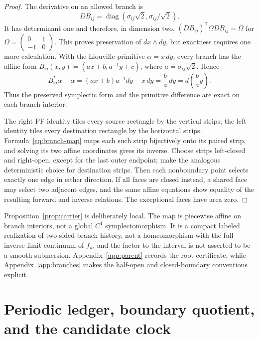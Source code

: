 \documentclass[11pt]{article}
\theoremstyle{definition}
\theoremstyle{remark}
\begin{document}
\begin{proof}
The derivative on an allowed branch is
\begin{equation}
 DB_{ij}=\operatorname{diag}
 (\sigma_{ij}\sqrt2,\sigma_{ij}/\sqrt2).
 \label{eq:jacobian}
\end{equation}
It has determinant one and therefore, in dimension two,
\((DB_{ij})^{\mathsf T}\Omega DB_{ij}=\Omega\) for
\(\Omega=\left(\begin{smallmatrix}0&1\\-1&0\end{smallmatrix}\right)\).
This proves preservation of \(dx\wedge dy\), but exactness requires one more
calculation.  With the Liouville primitive \(\alpha=x\,dy\), every branch has
the affine form
\(B_{ij}(x,y)=(a x+b,a^{-1}y+c)\), where
\(a=\sigma_{ij}\sqrt2\).  Hence
\begin{equation}
 B_{ij}^{*}\alpha-\alpha
 =(a x+b)a^{-1}dy-x\,dy
 =\frac{b}{a}\,dy
 =d\!\left(\frac{b}{a}y\right).
 \label{eq:exactness}
\end{equation}
Thus the preserved symplectic form and the primitive difference are exact on
each branch interior.

The right PF identity tiles every source rectangle by the vertical strips;
the left identity tiles every destination rectangle by the horizontal
strips.  Formula~\eqref{eq:branch-map} maps each such strip bijectively onto
its paired strip, and solving its two affine coordinates gives its inverse.
Choose strips left-closed and right-open, except for the last outer endpoint;
make the analogous deterministic choice for destination strips.  Then each
nonboundary point selects exactly one edge in either direction.  If all faces
are closed instead, a shared face may select two adjacent edges, and the
same affine equations show equality of the resulting forward and inverse
relations.  The exceptional faces have area zero.
\end{proof}

Proposition~\ref{prop:carrier} is deliberately local.  The map is piecewise
affine on branch interiors, not a global \(C^1\) symplectomorphism.  It is a
compact labeled realization of two-sided branch history, not a homeomorphism
with the full inverse-limit continuum of \(f_u\), and the factor to the
interval is not asserted to be a smooth submersion.  Appendix~\ref{app:parent}
records the root certificate, while Appendix~\ref{app:branches} makes the
half-open and closed-boundary conventions explicit.

\section{Periodic ledger, boundary quotient, and the candidate clock}
\label{sec:ledger}
\end{document}
